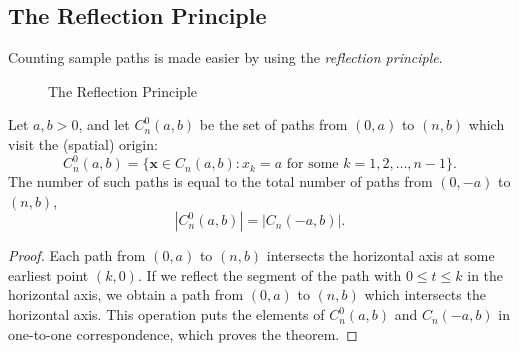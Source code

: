 \subsection{The Reflection Principle}
Counting sample paths is made easier by using the \emph{reflection principle}.

\begin{figure}
\centering{}
\caption{The Reflection Principle\label{reflection_principle}}
\end{figure}

%
\begin{theorem}
Let $a,b>0$, and let $C^{0}_n(a,b)$ be the set of paths from $(0,a)$ to $(n,b)$ which visit the (spatial) origin:%
\[
C^{0}_n(a,b) = \big\{\mathbf{x}\in C_n(a,b): x_k=a \text{ for some } k=1,2,\ldots,n-1\}.
\]
The number of such paths is equal to the total number of paths from $(0,-a)$ to $(n,b)$,
\[
|C^0_n(a,b)| = |C_n(-a,b)|.
\]
\end{theorem}
\begin{proof}
Each path from $(0,a)$ to $(n,b)$ intersects the horizontal axis at some earliest point $(k,0)$. If we reflect the segment of the path with $0\leq t\leq k$ in the horizontal axis, we obtain a path from $(0,a)$ to $(n,b)$ which intersects the horizontal axis. This operation puts the elements of $C^0_n(a,b)$ and $C_n(-a,b)$ in one-to-one correspondence, which proves the theorem.
\end{proof}

%
%
%


%

